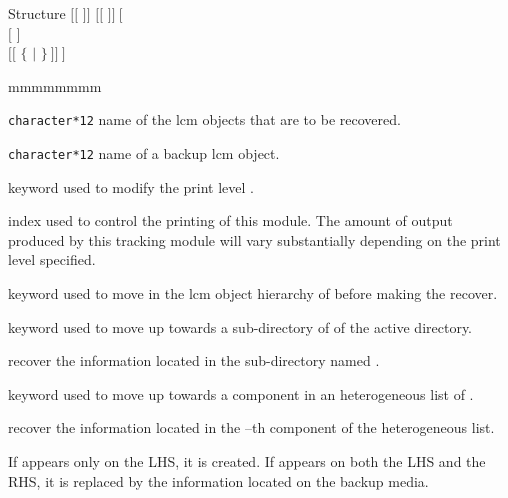 \begin{DataStructure}{Structure }
$[[$  $]]$ \moc{:=}   $[[$  $]]~[$ \moc{::} \\
$[$   $]$ \\
$[[$  $\{$   $|$   $\}~]]~]$ \moc{;}
\end{DataStructure}

\begin{ListeDeDescription}{mmmmmmmm}

\item[\dusa{NAME1}] {\tt character*12} name of the {\sc lcm} objects that are to
be recovered.

\item[\dusa{NAME2}] {\tt character*12} name of a backup {\sc lcm} object.

\item[\moc{EDIT}] keyword used to modify the print level .

\item[\dusa{iprint}] index used to control the printing of this module. The
amount of output produced by this tracking module will vary substantially
depending on the print level specified.

\item[\moc{STEP}] keyword used to move in the {\sc lcm} object hierarchy of  before making the recover.

\item[\moc{UP}] keyword used to move up towards a sub-directory of  of the
active directory.

\item[\dusa{NOMDIR}] recover the information located in the sub-directory named .

\item[\moc{AT}] keyword used to move up towards a component in an heterogeneous list of .

\item[\dusa{index}] recover the information located in the --th component of the heterogeneous list.

\end{ListeDeDescription}

If  appears only on the LHS, it is created. If 
appears on both the LHS and the RHS, it is replaced by the information located
on the backup media.

